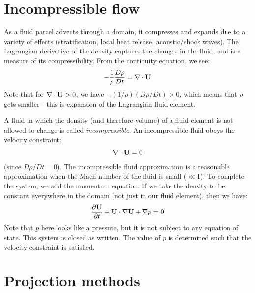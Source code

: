 \label{ch:incompressible}

\begin{quote}
\end{quote}

\section{Incompressible flow}

As a fluid parcel advects through a domain, it compresses and expands
due to a variety of effects (stratification, local heat release,
acoustic/shock waves).  The Lagrangian derivative of the density
captures the changes in the fluid, and is a measure of its compressibility.
From the continuity equation, we see:
\begin{equation}
-\frac{1}{\rho}\frac{D\rho}{Dt} = \nabla \cdot {\bf U}
\end{equation}
Note that for $\nabla \cdot {\bf U} > 0$, we have $-(1/\rho) (D\rho/Dt) > 0$,
which means that $\rho$ gets smaller---this is expansion of the Lagrangian
fluid element.

A fluid in which the density (and therefore volume) of a fluid element is not
allowed to change is called {\em incompressible}.  An incompressible
fluid obeys the velocity constraint:
\begin{equation}
\nabla \cdot {\bf U} = 0
\end{equation}
(since $D\rho / Dt = 0$).  The incompressible fluid approximation is 
a reasonable approximation when the Mach number of the fluid is small
($\ll 1$).  To complete the system, we add the momentum equation.  If 
we take the density to be constant everywhere in the domain (not just
in our fluid element), then we have:
\begin{equation}
\frac{\partial {\bf U}}{\partial t} + {\bf U} \cdot \nabla {\bf U} + \nabla p = 0
\end{equation}
Note that $p$ here looks like a pressure, but it is not subject to
any equation of state.  This system is closed as written.  The value
of $p$ is determined such that the velocity constraint is satisfied.



\section{Projection methods}

